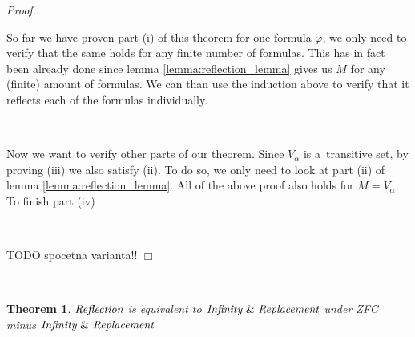 \documentclass[12pt,a4paper]{article}
\newtheorem{theorem}{Theorem}[section]
\newenvironment{proof}
{\noindent \textit{Proof.}}
{\hspace*{\fill} $\Box$}
\begin{document}
\begin{proof}
\

So far we have proven part (i) of this theorem for one formula $\varphi$, we only need to verify that the same holds for any finite number of formulas. This has in fact been already done since lemma \ref{lemma:reflection_lemma} gives us $M$ for any (finite) amount of formulas. We can than use the induction above  to verify that it reflects each of the formulas individually. 

\

Now we want to verify other parts of our theorem. Since $V_\alpha$ is a~transitive set, by proving (iii) we also satisfy (ii). To do so, we only need to look at part (ii) of lemma \ref{lemma:reflection_lemma}. All of the above proof also holds for $M = V_\alpha$. To finish part (iv)

\

TODO spocetna varianta!!
\end{proof}

\

\begin{theorem}
$\emph{Reflection}$ is equivalent to $\emph{Infinity}\ \&\ \emph{Replacement}$ under ZFC minus $\emph{Infinity}\ \&\ \emph{Replacement}$
\end{theorem}

\
\end{document}
